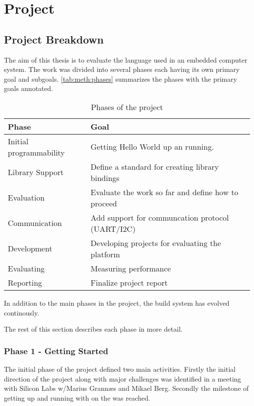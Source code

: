 \section{Project}

\subsection{Project Breakdown}

The aim of this thesis is to evaluate the {\rust} language used in an embedded computer system.
The work was divided into several phases each having its own primary goal and subgoals.
\autoref{tab:meth:phases} summarizes the phases with the primary goals annotated.

\begin{table}[H]
  \begin{center}
    \begin{tabular}{|l|l|}
      \hline
      Phase&Goal \\
      \hline
      \hline
      Initial programmability&Getting Hello World up an running.\\
      \hline
      Library Support&Define a standard for creating library bindings\\
      \hline
      Evaluation&Evaluate the work so far and define how to proceed\\
      \hline
      Communication&Add support for communcation protocol (UART/I2C)\\
      \hline
      Development&Developing projects for evaluating the platform\\
      \hline
      Evaluating&Measuring performance\\
      \hline
      Reporting&Finalize project report\\
      \hline
    \end{tabular}
  \end{center}
  \caption{Phases of the project}
  \label{tab:meth:phases}
\end{table}

In addition to the main phases in the project, the build system has evolved continously.

The rest of this section describes each phase in more detail.

\subsubsection{Phase 1 - Getting Started}
The initial phase of the project defined two main activities.
Firstly the initial direction of the project along with major challenges was identified in a meeting with Silicon Labs w/Marius Grannæs and Mikael Berg.
Secondly the milestone of getting up and running with {\rust} on the {\gecko} was reached.

